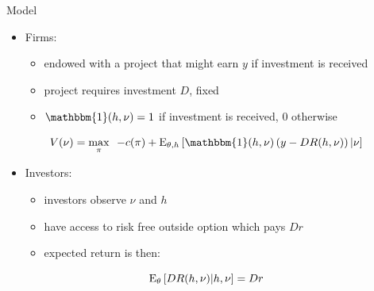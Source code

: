 \documentclass{beamer}
\begin{document}
\begin{frame}{Model}
\begin{itemize}
	\item Firms:
	\begin{itemize}
		\item endowed with a project that might earn $y$ if investment is received
		\item project requires investment $D$, fixed
		\item $\mathbbm{1}(h,\nu)=1$ if investment is received, 0 otherwise
	\end{itemize}
\end{itemize}
\begin{equation}
	\label{eq:FP}V(\nu)=\max_{\pi} \,\,\, -c(\pi)+\textup{E}_{\theta,h}\left [ \mathbbm{1}(h,\nu) \left (y - DR(h,\nu) \right )|\nu\right ]
\end{equation}
\begin{itemize}
	\item Investors:
	\begin{itemize}
		\item investors observe $\nu$ and $h$
		\item have access to risk free outside option which pays $Dr$
		\item expected return is then:
	\end{itemize}
\end{itemize}
\begin{equation}
	\textup{E}_{\theta} \left [DR(h,\nu)|h,\nu \right ] = Dr
\end{equation}
\end{frame}
\end{document}
